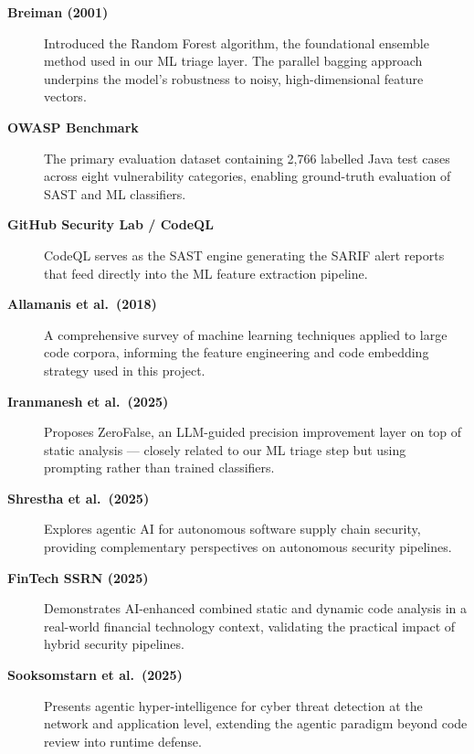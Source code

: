 \begin{description}
  \item[\textbf{Breiman (2001) \cite{breiman2001randomforests}}]
    Introduced the Random Forest algorithm, the foundational ensemble method
    used in our ML triage layer. The parallel bagging approach underpins the
    model's robustness to noisy, high-dimensional feature vectors.

  \item[\textbf{OWASP Benchmark \cite{owasp2023benchmark}}]
    The primary evaluation dataset containing 2,766 labelled Java test cases
    across eight vulnerability categories, enabling ground-truth evaluation
    of SAST and ML classifiers.

  \item[\textbf{GitHub Security Lab / CodeQL \cite{githubseclab2023codeql}}]
    CodeQL serves as the SAST engine generating the SARIF alert reports that
    feed directly into the ML feature extraction pipeline.

  \item[\textbf{Allamanis et al.\ (2018) \cite{allamanis2018mlbigcode}}]
    A comprehensive survey of machine learning techniques applied to large
    code corpora, informing the feature engineering and code embedding
    strategy used in this project.

  \item[\textbf{Iranmanesh et al.\ (2025) \cite{iranmanesh2025zerofalse}}]
    Proposes ZeroFalse, an LLM-guided precision improvement layer on top of
    static analysis --- closely related to our ML triage step but using
    prompting rather than trained classifiers.

  \item[\textbf{Shrestha et al.\ (2025) \cite{shrestha2025agentic}}]
    Explores agentic AI for autonomous software supply chain security,
    providing complementary perspectives on autonomous security pipelines.

  \item[\textbf{FinTech SSRN (2025) \cite{fintech2025vuln}}]
    Demonstrates AI-enhanced combined static and dynamic code analysis in a
    real-world financial technology context, validating the practical impact
    of hybrid security pipelines.

  \item[\textbf{Sooksomstarn et al.\ (2025) \cite{sooksomstarn2025agentic}}]
    Presents agentic hyper-intelligence for cyber threat detection at the
    network and application level, extending the agentic paradigm beyond
    code review into runtime defense.
\end{description}

